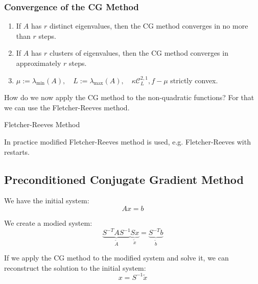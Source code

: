 \subsubsection{Convergence of the CG Method}

\begin{enumerate}
    \item If $A$ has $r$ distinct eigenvalues, then the CG method converges in no more than $r$ steps.
    \item If $A$ has $r$ clusters of eigenvalues, then the CG method converges in approximately $r$ steps.
    \item $\mu := \lambda_{\min}(A), \quad L := \lambda_{\max}(A), \quad \kappa \mathcal{C}_{L}^{2,1}, f - \mu$ strictly convex.
\end{enumerate}

How do we now apply the CG method to the non-quadratic functions? For that we can use the Fletcher-Reeves method.

\begin{algorithm}
    \caption{Fletcher-Reeves Method}
    \begin{algorithmic}[1]
        \EndIf
    \EndFor
    \end{algorithmic}
\end{algorithm}

In practice modified Fletcher-Reeves method is used, e.g. Fletcher-Reeves with restarts.

\subsection{Preconditioned Conjugate Gradient Method}

We have the initial system: 
\[ 
    A x = b
\] 

We create a modied system:
\[ 
    \underbrace{S^{-T} A S^{-1}}_{\tilde{A}} \underbrace{S x}_{\tilde{x}} = \underbrace{S^{-T} b}_{\tilde{b}}
\] 

If we apply the CG method to the modified system and solve it, we can reconstruct the solution to the initial system: 
\[ 
    x = S^{-1} \tilde{x}
\] 


